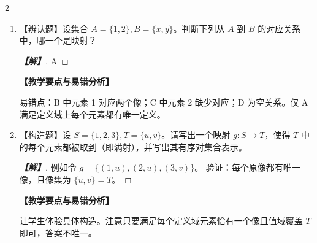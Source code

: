 \documentclass[12pt]{ctexart}
\newlength{\fillinwidth}
\newenvironment{solution}[1][解]{%
    \par\begingroup\color{blue!85!black}%
    \begin{proof}[\indent\bfseries\color{blue!85!black}【#1】]%
  }{%
    \end{proof}\endgroup\par
  }
\newenvironment{teacherNote}[1][教学要点与易错分析]{%
    \par\vspace{0.6ex}%
    \begingroup\color{teal!80!black}\small
    \noindent\textbf{【#1】}\par\vspace{0.2ex}%
  }{%
    \endgroup\par\vspace{0.6ex}%
  }
\newcommand{\ansspace}[1]{\par\vspace{0.4ex}}
\newcommand{\fillin}[2][]{%
    \if\relax\detokenize{#1}\relax
      \underline{\hspace{#2}}%
    \else
      \ifmmode
        \settowidth{\fillinwidth}{$\bm{#1}$}%
        \ifdim\fillinwidth>#2
          \underline{\hspace{0.5em}{\color{blue!85!black}\bm{#1}}\hspace{0.5em}}%
        \else
          \underline{\makebox[#2][c]{$\color{blue!85!black}\bm{#1}$}}%
        \fi
      \else
        \settowidth{\fillinwidth}{\bfseries#1}%
        \ifdim\fillinwidth>#2
          \underline{\hspace{0.5em}\textbf{\color{blue!85!black}#1}\hspace{0.5em}}%
        \else
          \underline{\makebox[#2][c]{\bfseries\color{blue!85!black}#1}}%
        \fi
      \fi
    \fi
  }
\newcommand{\ansspace}[1]{\vspace{#1}}
\newcommand{\fillin}[2][]{\underline{\hspace{#2}}}
\begin{document}
\begin{multicols}{2}
\begin{enumerate}[series=probchain]
\item 【辨认题】设集合 $A = \{1, 2\}, B = \{x, y\}$。判断下列从 $A$ 到 $B$ 的对应关系中，哪一个是映射？\fillin[A]{15mm}
\ansspace{1.5cm}
\begin{solution}
A
\end{solution}
\begin{teacherNote}
易错点：B 中元素 1 对应两个像；C 中元素 2 缺少对应；D 为空关系。仅 A 满足定义域上每个元素都有唯一定义。
\end{teacherNote}

\item 【构造题】设 $S = \{1, 2, 3\}, T = \{u, v\}$。请写出一个映射 $g: S \to T$，使得 $T$ 中的每个元素都被取到（即满射），并写出其有序对集合表示。
\ansspace{3.5cm}
\begin{solution}
例如令 $g = \{(1, u), (2, u), (3, v)\}$。
验证：每个原像都有唯一像，且像集为 $\{u, v\} = T$。
\end{solution}
\begin{teacherNote}
让学生体验具体构造。注意只要满足每个定义域元素恰有一个像且值域覆盖 $T$ 即可，答案不唯一。
\end{teacherNote}


\end{enumerate}
\end{multicols}
\end{document}

